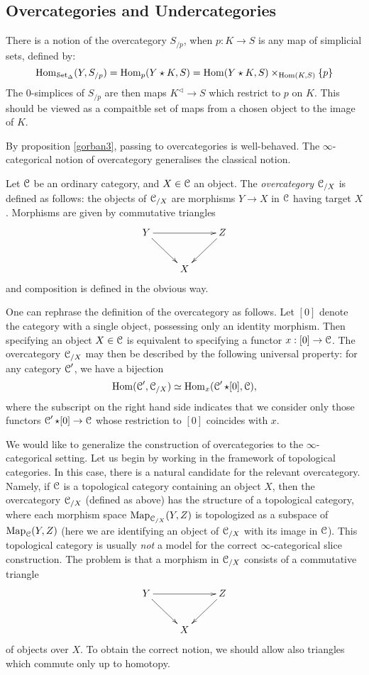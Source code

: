 \subsection{Overcategories and Undercategories}\label{slices}
\begin{1.2.9 Over- and under-categories}
\begin{shaded}
There is a notion of the overcategory $S_{/p}$, when $p:K\to S$ is any map of simplicial sets, defined by:
\[\operatorname{Hom}_{\operatorname{\mathcal{S}et_{\Delta}}}(Y, S_{/p}) = \operatorname{Hom}_{p}( Y \star K, S)=\operatorname{Hom}(Y\star K,S)\times_{\operatorname{Hom}(K,S)}\{p\}\]
The 0-simplices of $S_{/p}$ are then maps $K^{\triangleleft}\to S$ which restrict to $p$ on $K$. This should be viewed as a compaitble set of maps from a chosen object to the image of $K$.

By proposition \ref{gorban3}, passing to overcategories is well-behaved. The $\infty$-categorical notion of overcategory generalises the classical notion.
\end{shaded}
Let $\operatorname{\mathcal{C}}$ be an ordinary category, and $X \in \operatorname{\mathcal{C}}$ an object.
The {\it overcategory} $\operatorname{\mathcal{C}}_{/X}$ is defined as follows:
the objects of $\operatorname{\mathcal{C}}_{/X}$ are
morphisms $Y \rightarrow X$ in $\operatorname{\mathcal{C}}$ having target $X$.
Morphisms are given by commutative triangles
$$\xymatrix{ Y \ar[dr] \ar[rr] & & Z \ar[dl] \\
& X }$$
and composition is defined in the obvious way.

One can rephrase the definition of the overcategory as follows.
Let $[0]$ denote the category with a single object, possessing
only an identity morphism. Then specifying an object $X \in \operatorname{\mathcal{C}}$
is equivalent to specifying a functor $x: [0] \rightarrow
\operatorname{\mathcal{C}}$. The overcategory $\operatorname{\mathcal{C}}_{/X}$ may then be described by
the following universal property: for any category $\operatorname{\mathcal{C}}'$, we
have a bijection
$$ \operatorname{Hom}(\operatorname{\mathcal{C}}', \operatorname{\mathcal{C}}_{/X}) \simeq \operatorname{Hom}_{x}(\operatorname{\mathcal{C}}' \star [0],
\operatorname{\mathcal{C}}),$$ where the subscript on the right hand side indicates
that we consider only those functors $\operatorname{\mathcal{C}}' \star [0]
\rightarrow \operatorname{\mathcal{C}}$ whose restriction to $[0]$ coincides with
$x$.

We would like to generalize the construction of overcategories to the $\infty$-categorical setting. 
Let us begin by working in the framework of topological categories. In this case, there is a natural candidate for the relevant overcategory. Namely, if $\operatorname{\mathcal{C}}$ is a topological category containing an object $X$, then the overcategory $\operatorname{\mathcal{C}}_{/X}$ (defined as above) has the structure of a topological category, where each morphism space $\operatorname{{Map}}_{ \operatorname{\mathcal{C}}_{/X} }(Y,Z)$ is topologized as a subspace
of $\operatorname{{Map}}_{\operatorname{\mathcal{C}}}(Y,Z)$ (here we are identifying an object of $\operatorname{\mathcal{C}}_{/X}$ with its image in $\operatorname{\mathcal{C}}$). This topological category is usually {\em
not} a model for the correct $\infty$-categorical slice
construction. The problem is that a morphism in $\operatorname{\mathcal{C}}_{/X}$ consists
of a commutative triangle
$$\xymatrix{ Y \ar[dr] \ar[rr] & & Z \ar[dl] \\
& X }$$
of objects over $X$. To obtain the correct notion, we should allow also
triangles which commute only up to homotopy. 


\end{1.2.9 Over- and under-categories}
